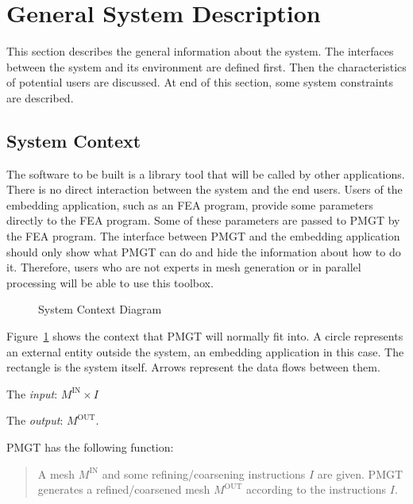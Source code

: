 \documentclass[12pt,titlepage]{article}
\begin{document}
\section{General System Description \label{AreqSecGSD}}

This section describes the general information about the system. The interfaces between the system and its environment are defined first. Then the characteristics of potential users are discussed. At end of this section, some system constraints are described.

\subsection{System Context}
The software to be built is a library tool that will be called by other applications. There is no direct interaction between the system and the end users. Users of the embedding application, such as an FEA program, provide some parameters directly to the FEA program. Some of these parameters are passed to PMGT by the FEA program. The interface between PMGT and the embedding application should only show what PMGT can do and hide the information about how to do it. Therefore, users who are not experts in mesh generation or in parallel processing will be able to use this toolbox.  %
\begin{figure}[ht]
\centering
{}
\caption{System Context Diagram}
\label{AreqSyscon}
\end{figure}

Figure~\ref{AreqSyscon} shows the context that PMGT will normally fit into.
A circle represents an external entity outside the system, an embedding application in this case. The rectangle is the system itself. Arrows represent the data flows between them.

The \emph{input}: $M^{\mbox{IN}}\times I$ 

The \emph{output}: $M^{\mbox{OUT}}$.

PMGT has the following function:
\begin{quote}
A mesh $M^{\mbox{IN}}$ and some refining/coarsening instructions $I$ are given. PMGT generates a refined/coarsened mesh $M^{\mbox{OUT}}$ according to the instructions $I$. 
\end{quote}

\end{document}
